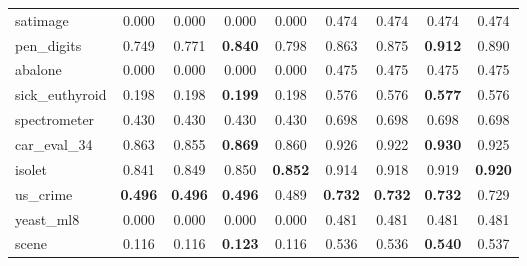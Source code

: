 \begin{figure}[ht]
\begin{tabular}{p{22mm}|*4{p{14mm}}|*4{p{14mm}}}
        satimage&\multicolumn{1}{c}{0.000}&\multicolumn{1}{c}{0.000}&\multicolumn{1}{c}{0.000}&\multicolumn{1}{c|}{0.000}&\multicolumn{1}{c}{0.474}&\multicolumn{1}{c}{0.474}&\multicolumn{1}{c}{0.474}&\multicolumn{1}{c}{0.474}\\
        pen\_digits&\multicolumn{1}{c}{0.749}&\multicolumn{1}{c}{0.771}&\multicolumn{1}{c}{\textbf{0.840}}&\multicolumn{1}{c|}{0.798}&\multicolumn{1}{c}{0.863}&\multicolumn{1}{c}{0.875}&\multicolumn{1}{c}{\textbf{0.912}}&\multicolumn{1}{c}{0.890}\\
        abalone&\multicolumn{1}{c}{0.000}&\multicolumn{1}{c}{0.000}&\multicolumn{1}{c}{0.000}&\multicolumn{1}{c|}{0.000}&\multicolumn{1}{c}{0.475}&\multicolumn{1}{c}{0.475}&\multicolumn{1}{c}{0.475}&\multicolumn{1}{c}{0.475}\\
        sick\_euthyroid&\multicolumn{1}{c}{0.198}&\multicolumn{1}{c}{0.198}&\multicolumn{1}{c}{\textbf{0.199}}&\multicolumn{1}{c|}{0.198}&\multicolumn{1}{c}{0.576}&\multicolumn{1}{c}{0.576}&\multicolumn{1}{c}{\textbf{0.577}}&\multicolumn{1}{c}{0.576}\\
        spectrometer&\multicolumn{1}{c}{0.430}&\multicolumn{1}{c}{0.430}&\multicolumn{1}{c}{0.430}&\multicolumn{1}{c|}{0.430}&\multicolumn{1}{c}{0.698}&\multicolumn{1}{c}{0.698}&\multicolumn{1}{c}{0.698}&\multicolumn{1}{c}{0.698}\\
        car\_eval\_34&\multicolumn{1}{c}{0.863}&\multicolumn{1}{c}{0.855}&\multicolumn{1}{c}{\textbf{0.869}}&\multicolumn{1}{c|}{0.860}&\multicolumn{1}{c}{0.926}&\multicolumn{1}{c}{0.922}&\multicolumn{1}{c}{\textbf{0.930}}&\multicolumn{1}{c}{0.925}\\
        isolet&\multicolumn{1}{c}{0.841}&\multicolumn{1}{c}{0.849}&\multicolumn{1}{c}{0.850}&\multicolumn{1}{c|}{\textbf{0.852}}&\multicolumn{1}{c}{0.914}&\multicolumn{1}{c}{0.918}&\multicolumn{1}{c}{0.919}&\multicolumn{1}{c}{\textbf{0.920}}\\
        us\_crime&\multicolumn{1}{c}{\textbf{0.496}}&\multicolumn{1}{c}{\textbf{0.496}}&\multicolumn{1}{c}{\textbf{0.496}}&\multicolumn{1}{c|}{0.489}&\multicolumn{1}{c}{\textbf{0.732}}&\multicolumn{1}{c}{\textbf{0.732}}&\multicolumn{1}{c}{\textbf{0.732}}&\multicolumn{1}{c}{0.729}\\
        yeast\_ml8&\multicolumn{1}{c}{0.000}&\multicolumn{1}{c}{0.000}&\multicolumn{1}{c}{0.000}&\multicolumn{1}{c|}{0.000}&\multicolumn{1}{c}{0.481}&\multicolumn{1}{c}{0.481}&\multicolumn{1}{c}{0.481}&\multicolumn{1}{c}{0.481}\\
        scene&\multicolumn{1}{c}{0.116}&\multicolumn{1}{c}{0.116}&\multicolumn{1}{c}{\textbf{0.123}}&\multicolumn{1}{c|}{0.116}&\multicolumn{1}{c}{0.536}&\multicolumn{1}{c}{0.536}&\multicolumn{1}{c}{\textbf{0.540}}&\multicolumn{1}{c}{0.537}\\

\end{tabular}
\end{figure}
